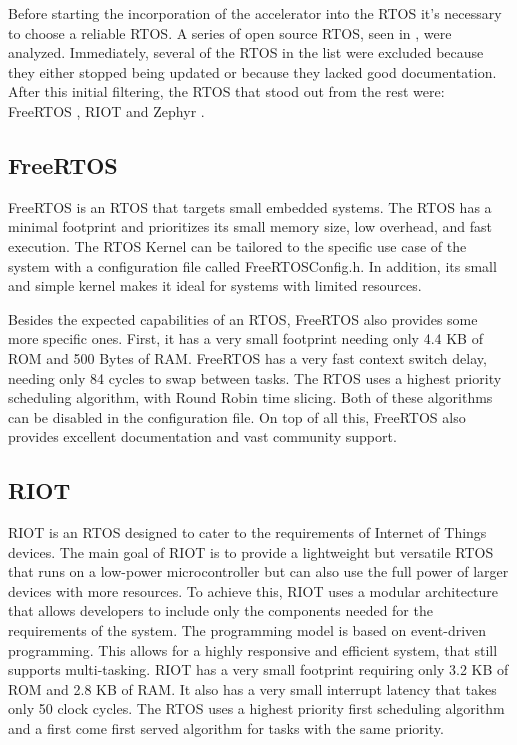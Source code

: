 Before starting the incorporation of the accelerator into the RTOS it's necessary to choose a reliable RTOS. A series of open source RTOS, seen in \cite{RTOS_List}, were analyzed. Immediately, several of the RTOS in the list were excluded because they either stopped being updated or because they lacked good documentation. After this initial filtering, the RTOS that stood out from the rest were: FreeRTOS \cite{freeRTOS}, RIOT \cite{RIOT} and Zephyr \cite{zephyr}.

\subsection{FreeRTOS}
FreeRTOS is an RTOS that targets small embedded systems. The RTOS has a minimal footprint and prioritizes its small memory size, low overhead, and fast execution. The RTOS Kernel can be tailored to the specific use case of the system with a configuration file called FreeRTOSConfig.h. In addition, its small and simple kernel makes it ideal for systems with limited resources.

Besides the expected capabilities of an RTOS, FreeRTOS also provides some more specific ones. First, it has a very small footprint needing only 4.4 KB of ROM and 500 Bytes of RAM. FreeRTOS has a very fast context switch delay, needing only 84 cycles to swap between tasks. The RTOS uses a highest priority scheduling algorithm, with Round Robin time slicing. Both of these algorithms can be disabled in the configuration file. On top of all this, FreeRTOS also provides excellent documentation and vast community support.

\subsection{RIOT}
RIOT is an RTOS designed to cater to the requirements of Internet of Things devices. The main goal of RIOT is to provide a lightweight but versatile RTOS that runs on a low-power microcontroller but can also use the full power of larger devices with more resources. To achieve this, RIOT uses a modular architecture that allows developers to include only the components needed for the requirements of the system. The programming model is based on event-driven programming. This allows for a highly responsive and efficient system, that still supports multi-tasking. RIOT has a very small footprint requiring only 3.2 KB of ROM and 2.8 KB of RAM. It also has a very small interrupt latency that takes only 50 clock cycles. The RTOS uses a highest priority first scheduling algorithm and a first come first served algorithm for tasks with the same priority.

